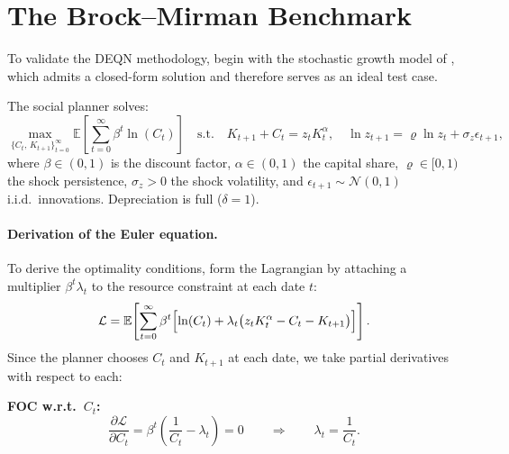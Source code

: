 \documentclass[11pt,a4paper]{report}
\newcommand{\E}[1]{\mathbb{E}\!\left[#1\right]}
\begin{document}
\section{The Brock--Mirman Benchmark}
\label{sec:bm}

To validate the DEQN methodology, \citet{azinovicDEEPEQUILIBRIUMNETS2022} begin with the stochastic growth model of \citet{brock1972optimal}, which admits a closed-form solution and therefore serves as an ideal test case.

The social planner solves:
\begin{equation}
\max_{\{C_t,\, K_{t+1}\}_{t=0}^{\infty}} \E{\sum_{t=0}^{\infty} \beta^t \ln(C_t)}
\quad\text{s.t.}\quad
K_{t+1} + C_t = z_t K_t^\alpha, \quad \ln z_{t+1} = \varrho \ln z_t + \sigma_z \epsilon_{t+1},
\label{eq:bm_problem}
\end{equation}
where $\beta \in (0,1)$ is the discount factor, $\alpha \in (0,1)$ the capital share, $\varrho \in [0,1)$ the shock persistence, $\sigma_z > 0$ the shock volatility, and $\epsilon_{t+1} \sim \mathcal{N}(0,1)$ i.i.d.\ innovations.  Depreciation is full ($\delta = 1$).

\paragraph{Derivation of the Euler equation.}
To derive the optimality conditions, form the Lagrangian by attaching a multiplier $\beta^t \lambda_t$ to the resource constraint at each date $t$:
\begin{equation}
\mathcal{L} = \E{\sum_{t=0}^{\infty} \beta^t \Bigl[\ln(C_t) + \lambda_t \bigl(z_t K_t^\alpha - C_t - K_{t+1}\bigr)\Bigr]}.
\label{eq:bm_lagrangian}
\end{equation}
Since the planner chooses $C_t$ and $K_{t+1}$ at each date, we take partial derivatives with respect to each:

\medskip
\noindent\textbf{FOC w.r.t.\ $C_t$:}
\begin{equation}
\frac{\partial \mathcal{L}}{\partial C_t} = \beta^t\!\left(\frac{1}{C_t} - \lambda_t\right) = 0
\qquad\Longrightarrow\qquad
\lambda_t = \frac{1}{C_t}.
\label{eq:bm_foc_c}
\end{equation}
\end{document}
